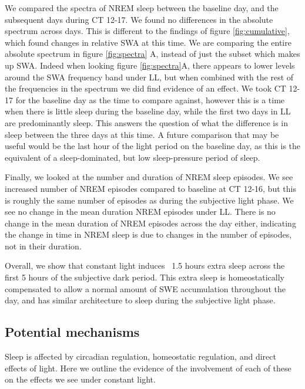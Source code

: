We compared the spectra of NREM sleep between the baseline day, and 
the subsequent days during CT 12-17. 
We found no differences in the absolute spectrum across days.
This is different to the findings of figure \ref{fig:cumulative}, which 
found changes in relative SWA at this time. 
We are comparing the entire absolute spectrum in figure \ref{fig:spectra} A, 
instead of just the subset which makes up SWA. 
Indeed when looking figure \ref{fig:spectra}A, there appears to lower levels 
around the SWA frequency band under LL, but when combined with the rest of the 
frequencies in the spectrum we did find evidence of an effect.
We took CT 12-17 for the baseline day as the time to compare against,
however this is a time when there is little sleep during the baseline 
day, while the first two days in LL are predominantly sleep. 
This answers the question of what the difference is in sleep between
the three days at this time.
A future comparison that may be useful would be the last hour of the 
light period on the baseline day, as this is the equivalent of a 
sleep-dominated, but low sleep-pressure period of sleep. 

Finally, we looked at the number and duration of NREM sleep episodes.
We see increased number of NREM episodes compared to baseline at CT 12-16,
but this is roughly the same number of episodes as during the subjective
light phase. 
We see no change in the mean duration NREM episodes under LL.
There is no change in the mean duration of NREM episodes across the 
day either, indicating the change in time in NREM sleep is due to 
changes in the number of episodes, not in their duration.
\newline

Overall, we show that constant light induces ~1.5 hours extra sleep
across the first 5 hours of the subjective dark period.
This extra sleep is homeostatically compensated to allow a normal
amount of SWE accumulation throughout the day, and has similar
architecture to sleep during the subjective light phase.

\subsection{Potential mechanisms}
Sleep is affected by circadian regulation, homeostatic regulation,
and direct effects of light. 
Here we outline the evidence of the involvement of each of these 
on the effects we see under constant light.
